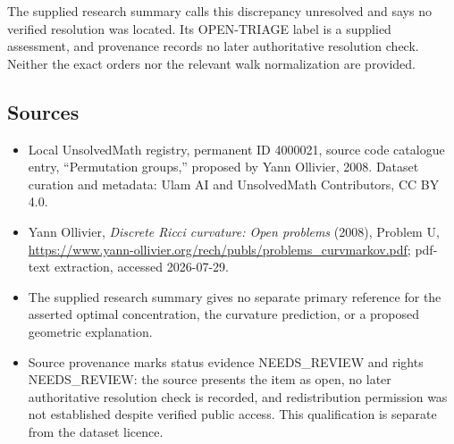 \documentclass[11pt]{article}
\begin{document}
The supplied research summary calls this discrepancy unresolved and says no verified resolution was located. Its OPEN-TRIAGE label is a supplied assessment, and provenance records no later authoritative resolution check. Neither the exact orders nor the relevant walk normalization are provided.
\subsection{Sources}
\begin{itemize}
\item Local UnsolvedMath registry, permanent ID 4000021, source code catalogue entry, ``Permutation groups,'' proposed by Yann Ollivier, 2008. Dataset curation and metadata: Ulam AI and UnsolvedMath Contributors, CC BY 4.0.
\item Yann Ollivier, \emph{Discrete Ricci curvature: Open problems} (2008), Problem U, \url{https://www.yann-ollivier.org/rech/publs/problems_curvmarkov.pdf}; pdf-text extraction, accessed 2026-07-29.
\item The supplied research summary gives no separate primary reference for the asserted optimal concentration, the curvature prediction, or a proposed geometric explanation.
\item Source provenance marks status evidence NEEDS\_REVIEW and rights NEEDS\_REVIEW: the source presents the item as open, no later authoritative resolution check is recorded, and redistribution permission was not established despite verified public access. This qualification is separate from the dataset licence.
\end{itemize}
\end{document}
